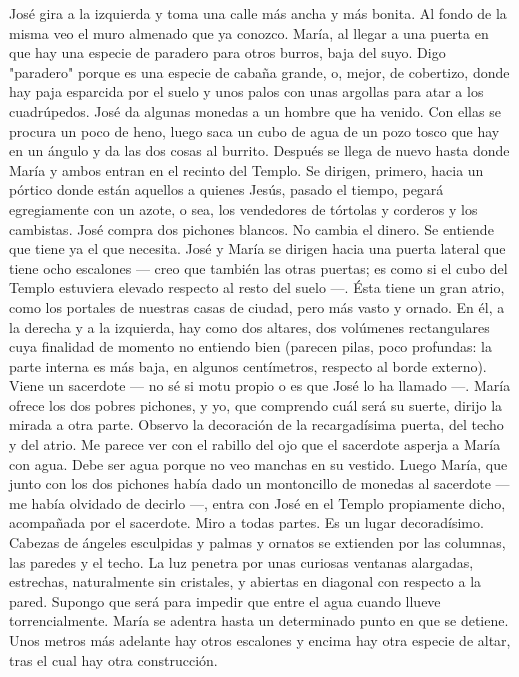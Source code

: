 \documentclass[12pt]{book} %
\begin{document}
José gira a la izquierda y toma una calle más ancha y más bonita. Al fondo de la misma veo el muro almenado que ya conozco. 
María, al llegar a una puerta en que hay una especie de paradero para otros burros, baja del suyo. Digo "paradero" porque es una especie de cabaña grande, o, mejor, de cobertizo, donde hay paja esparcida por el suelo y unos palos con unas argollas para atar a los cuadrúpedos. 
José da algunas monedas a un hombre que ha venido. Con ellas se procura un poco de heno, luego saca un cubo de 
agua de un pozo tosco que hay en un ángulo y da las dos cosas al burrito. Después se llega de nuevo hasta donde María y ambos entran en el recinto del Templo. 
Se dirigen, primero, hacia un pórtico donde están aquellos a quienes Jesús, pasado el tiempo, pegará egregiamente con 
un azote, o sea, los vendedores de tórtolas y corderos y los cambistas. José compra dos pichones blancos. No cambia el dinero. Se entiende que tiene ya el que necesita. 
José y María se dirigen hacia una puerta lateral que tiene ocho escalones — creo que también las otras puertas; es como si el cubo del Templo estuviera elevado respecto al resto del suelo —. Ésta tiene un gran atrio, como los portales de nuestras casas de ciudad, pero más vasto y ornado. En él, a la derecha y a la izquierda, hay como dos altares, dos volúmenes rectangulares cuya finalidad de momento no entiendo bien (parecen pilas, poco profundas: la parte interna es más baja, en algunos centímetros, respecto al borde externo). 
Viene un sacerdote — no sé si motu propio o es que José lo ha llamado —. María ofrece los dos pobres pichones, y yo, 
que comprendo cuál será su suerte, dirijo la mirada a otra parte. Observo la decoración de la recargadísima puerta, del techo y del atrio. Me parece ver con el rabillo del ojo que el sacerdote asperja a María con agua. Debe ser agua porque no veo manchas en su vestido. Luego María, que junto con los dos pichones había dado un montoncillo de monedas al sacerdote — me había olvidado de decirlo —, entra con José en el Templo propiamente dicho, acompañada por el sacerdote. 
Miro a todas partes. Es un lugar decoradísimo. Cabezas de ángeles esculpidas y palmas y ornatos se extienden por las 
columnas, las paredes y el techo. La luz penetra por unas curiosas ventanas alargadas, estrechas, naturalmente sin cristales, y abiertas en diagonal con respecto a la pared. Supongo que será para impedir que entre el agua cuando llueve torrencialmente. 
María se adentra hasta un determinado punto en que se detiene. Unos metros más adelante hay otros escalones y 
encima hay otra especie de altar, tras el cual hay otra construcción. 
\end{document}

